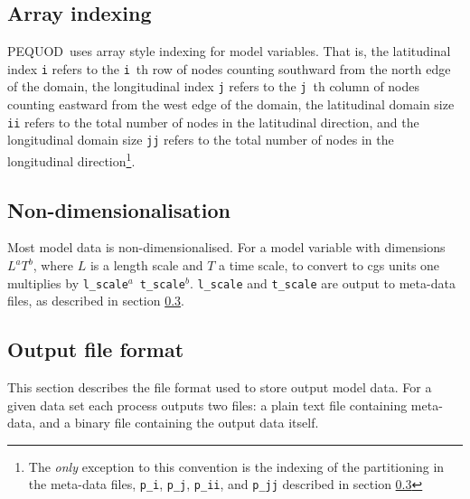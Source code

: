 \documentclass[a4paper]{book}
\newcommand{\pequod}{PEQUOD}
\begin{document}
\subsection{Array indexing}\label{sect:indexing}

\pequod\ uses array style indexing for model variables. That is, the
latitudinal index \verb+i+ refers to the \verb+i+~th row of nodes counting
southward from the north edge of the domain, the longitudinal index \verb+j+
refers to the \verb+j+~th column of nodes counting eastward from the west edge
of the domain, the latitudinal domain size \verb+ii+ refers to the total number
of nodes in the latitudinal direction, and the longitudinal domain size
\verb+jj+ refers to the total number of nodes in the longitudinal
direction\footnote{The \emph{only} exception to this convention is the indexing
of the partitioning in the meta-data files, \texttt{p\_i}, \texttt{p\_j},
\texttt{p\_ii}, and \texttt{p\_jj} described in section
\ref{sect:output_format}}.

\subsection{Non-dimensionalisation}\label{sect:non_dimensionalisation}

Most model data is non-dimensionalised. For a model variable with dimensions
$L^a T^b$, where $L$ is a length scale and $T$ a time scale, to convert to cgs
units one multiplies by \verb+l_scale+${}^a$~\verb+t_scale+${}^b$.
\verb+l_scale+ and \verb+t_scale+ are output to meta-data files, as described in
section \ref{sect:output_format}.

\subsection{Output file format}\label{sect:output_format}

This section describes the file format used to store output model data.
For a given data set each process outputs two files: a plain text file
containing meta-data, and a binary file containing the output data itself.
\end{document}
